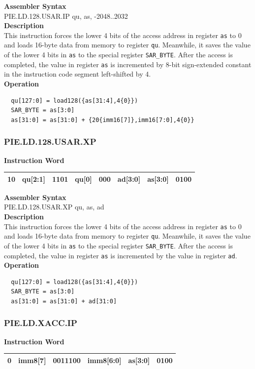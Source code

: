 \textbf{Assembler Syntax} \\
PIE.LD.128.USAR.IP qu, as, -2048..2032 \\
\textbf{Description} \\
This instruction forces the lower 4 bits of the access address in register \lstinline{as} to 0 and loads 16-byte data from memory to register \lstinline{qu}. Meanwhile, it saves the value of the lower 4 bits in \lstinline{as} to the special register \lstinline{SAR_BYTE}. After the access is completed, the value in register \lstinline{as} is incremented by 8-bit sign-extended constant in the instruction code segment left-shifted by 4.\\
\textbf{Operation}
\begin{lstlisting}
  qu[127:0] = load128({as[31:4],4{0}})
  SAR_BYTE = as[3:0]
  as[31:0] = as[31:0] + {20{imm16[7]},imm16[7:0],4{0}}
\end{lstlisting}

\newpage
\subsubsection{PIE.LD.128.USAR.XP}\label{instruction:PIELD128USARXP}
\setlength\tabcolsep{6pt}
\textbf{Instruction Word} \\
\begin{tabular}{|c|c|c|c|c|c|c|c|}
	\hline
	10 & qu[2:1] & 1101 & qu[0] & 000 & ad[3:0] & as[3:0] & 0100 \\
	\hline
\end{tabular}

\textbf{Assembler Syntax} \\
PIE.LD.128.USAR.XP qu, as, ad \\
\textbf{Description} \\
This instruction forces the lower 4 bits of the access address in register \lstinline{as} to 0 and loads 16-byte data from memory to register \lstinline{qu}. Meanwhile, it saves the value of the lower 4 bits in \lstinline{as} to the special register \lstinline{SAR_BYTE}. After the access is completed, the value in register \lstinline{as} is incremented by the value in register \lstinline{ad}.\\
\textbf{Operation}
\begin{lstlisting}
  qu[127:0] = load128({as[31:4],4{0}})
  SAR_BYTE = as[3:0]
  as[31:0] = as[31:0] + ad[31:0]
\end{lstlisting}

\newpage
\subsubsection{PIE.LD.XACC.IP}\label{instruction:PIELDXACCIP}
\setlength\tabcolsep{6pt}
\textbf{Instruction Word} \\
\begin{tabular}{|c|c|c|c|c|c|}
	\hline
	0 & imm8[7] & 0011100 & imm8[6:0] & as[3:0] & 0100 \\
	\hline
\end{tabular}

